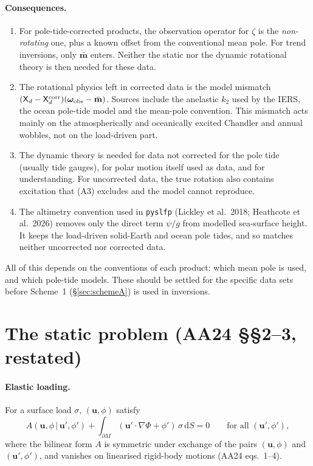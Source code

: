 \documentclass[11pt,a4paper]{article}
\newcommand{\bw}{\bm{\omega}}
\newcommand{\bu}{\mathbf{u}}
\newcommand{\dd}{\,\mathrm{d}}
\newcommand{\pM}{\partial M}
\begin{document}
\paragraph{Consequences.}
\begin{enumerate}
  \item For pole-tide-corrected products, the observation operator for $\zeta$ is the
  \emph{non-rotating} one, plus a known offset from the conventional mean pole. For trend
  inversions, only $\dot{\bar{\mathbf m}}$ enters. Neither the static nor the dynamic rotational
  theory is then needed for these data.
  \item The rotational physics left in corrected data is the model mismatch
  $(\mathsf{X}_d-\mathsf{X}^{\rm corr}_d)(\bw_{\rm obs}-\bar{\mathbf m})$. Sources include the
  anelastic $k_2$ used by the IERS, the ocean pole-tide model and the mean-pole convention. This
  mismatch acts mainly on the atmospherically and oceanically excited Chandler and annual wobbles,
  not on the load-driven part.
  \item The dynamic theory is needed for data not corrected for the pole tide (usually tide gauges),
  for polar motion itself used as data, and for understanding. For uncorrected data, the true
  rotation also contains excitation that (A3) excludes and the model cannot reproduce.
  \item The altimetry convention used in \texttt{pyslfp} (Lickley et al.\ 2018; Heathcote et
  al.\ 2026) removes only the direct term $\psi/g$ from modelled sea-surface height. It keeps the
  load-driven solid-Earth and ocean pole tides, and so matches neither uncorrected nor corrected data.
\end{enumerate}
All of this depends on the conventions of each product: which mean pole is used, and which
pole-tide models. These should be settled for the specific data sets before Scheme~1
(\S\ref{sec:schemeA}) is used in inversions.

\section{The static problem (AA24 \S\S2--3, restated)}
\label{sec:static}

\paragraph{Elastic loading.} For a surface load $\sigma$, $(\bu,\phi)$ satisfy
\begin{equation}
  A(\bu,\phi\,|\,\bu',\phi')+\int_{\pM}(\bu'\cdot\nabla\Phi+\phi')\,\sigma\dd S=0
  \qquad\text{for all }(\bu',\phi'),
  \label{eq:weak0}
\end{equation}
where the bilinear form $A$ is symmetric under exchange of the pairs $(\bu,\phi)$ and
$(\bu',\phi')$, and vanishes on linearised rigid-body motions (AA24 eqs.~1--4).
\end{document}
